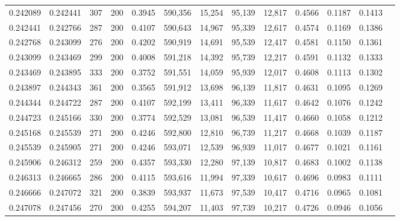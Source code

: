 \begin{tabular}{rrrrrrrrrrrrr}
0.242089 & 0.242441 &    307 & 200 &                                     0.3945 & 590,356 &  15,254 &  95,139 &  12,817 & 0.4566 & 0.1187 & 0.1413 \\
0.242441 & 0.242766 &    287 & 200 &                                     0.4107 & 590,643 &  14,967 &  95,339 &  12,617 & 0.4574 & 0.1169 & 0.1386 \\
0.242768 & 0.243099 &    276 & 200 &                                     0.4202 & 590,919 &  14,691 &  95,539 &  12,417 & 0.4581 & 0.1150 & 0.1361 \\
0.243099 & 0.243469 &    299 & 200 &                                     0.4008 & 591,218 &  14,392 &  95,739 &  12,217 & 0.4591 & 0.1132 & 0.1333 \\
0.243469 & 0.243895 &    333 & 200 &                                     0.3752 & 591,551 &  14,059 &  95,939 &  12,017 & 0.4608 & 0.1113 & 0.1302 \\
0.243897 & 0.244343 &    361 & 200 &                                     0.3565 & 591,912 &  13,698 &  96,139 &  11,817 & 0.4631 & 0.1095 & 0.1269 \\
0.244344 & 0.244722 &    287 & 200 &                                     0.4107 & 592,199 &  13,411 &  96,339 &  11,617 & 0.4642 & 0.1076 & 0.1242 \\
0.244723 & 0.245166 &    330 & 200 &                                     0.3774 & 592,529 &  13,081 &  96,539 &  11,417 & 0.4660 & 0.1058 & 0.1212 \\
0.245168 & 0.245539 &    271 & 200 &                                     0.4246 & 592,800 &  12,810 &  96,739 &  11,217 & 0.4668 & 0.1039 & 0.1187 \\
0.245539 & 0.245905 &    271 & 200 &                                     0.4246 & 593,071 &  12,539 &  96,939 &  11,017 & 0.4677 & 0.1021 & 0.1161 \\
0.245906 & 0.246312 &    259 & 200 &                                     0.4357 & 593,330 &  12,280 &  97,139 &  10,817 & 0.4683 & 0.1002 & 0.1138 \\
0.246313 & 0.246665 &    286 & 200 &                                     0.4115 & 593,616 &  11,994 &  97,339 &  10,617 & 0.4696 & 0.0983 & 0.1111 \\
0.246666 & 0.247072 &    321 & 200 &                                     0.3839 & 593,937 &  11,673 &  97,539 &  10,417 & 0.4716 & 0.0965 & 0.1081 \\
0.247078 & 0.247456 &    270 & 200 &                                     0.4255 & 594,207 &  11,403 &  97,739 &  10,217 & 0.4726 & 0.0946 & 0.1056 \\

\end{tabular}
